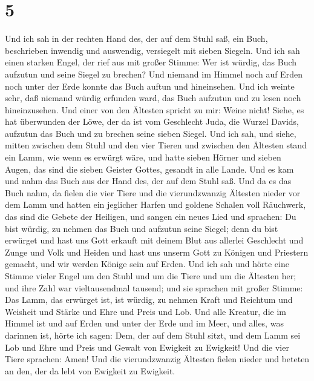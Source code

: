 \hypertarget{section-4}{%
\section{5}\label{section-4}}

 Und ich sah in der rechten Hand des, der auf dem Stuhl saß,
ein Buch, beschrieben inwendig und auswendig, versiegelt mit sieben
Siegeln.  Und ich sah einen starken Engel, der rief aus mit
großer Stimme: Wer ist würdig, das Buch aufzutun und seine Siegel zu
brechen?  Und niemand im Himmel noch auf Erden noch unter
der Erde konnte das Buch auftun und hineinsehen.  Und ich
weinte sehr, daß niemand würdig erfunden ward, das Buch aufzutun und zu
lesen noch hineinzusehen.  Und einer von den Ältesten
spricht zu mir: Weine nicht! Siehe, es hat überwunden der Löwe, der da
ist vom Geschlecht Juda, die Wurzel Davids, aufzutun das Buch und zu
brechen seine sieben Siegel.  Und ich sah, und siehe, mitten
zwischen dem Stuhl und den vier Tieren und zwischen den Ältesten stand
ein Lamm, wie wenn es erwürgt wäre, und hatte sieben Hörner und sieben
Augen, das sind die sieben Geister Gottes, gesandt in alle Lande.
 Und es kam und nahm das Buch aus der Hand des, der auf dem
Stuhl saß.  Und da es das Buch nahm, da fielen die vier
Tiere und die vierundzwanzig Ältesten nieder vor dem Lamm und hatten ein
jeglicher Harfen und goldene Schalen voll Räuchwerk, das sind die Gebete
der Heiligen,  und sangen ein neues Lied und sprachen: Du
bist würdig, zu nehmen das Buch und aufzutun seine Siegel; denn du bist
erwürget und hast uns Gott erkauft mit deinem Blut aus allerlei
Geschlecht und Zunge und Volk und Heiden  und hast uns
unserm Gott zu Königen und Priestern gemacht, und wir werden Könige sein
auf Erden.  Und ich sah und hörte eine Stimme vieler Engel
um den Stuhl und um die Tiere und um die Ältesten her; und ihre Zahl war
vieltausendmal tausend;  und sie sprachen mit großer
Stimme: Das Lamm, das erwürget ist, ist würdig, zu nehmen Kraft und
Reichtum und Weisheit und Stärke und Ehre und Preis und Lob.
 Und alle Kreatur, die im Himmel ist und auf Erden und
unter der Erde und im Meer, und alles, was darinnen ist, hörte ich
sagen: Dem, der auf dem Stuhl sitzt, und dem Lamm sei Lob und Ehre und
Preis und Gewalt von Ewigkeit zu Ewigkeit!  Und die vier
Tiere sprachen: Amen! Und die vierundzwanzig Ältesten fielen nieder und
beteten an den, der da lebt von Ewigkeit zu Ewigkeit.

